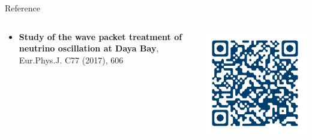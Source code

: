 \documentclass[usenames, dvipsnames]{beamer}
\newcommand{\Important}{\textcolor{BrickRed}}
\newcommand{\impitem}{\item[\Important{$\bullet$}]}
\begin{document}
\begin{frame}[fragile]
\begin{columns}[T]
\begin{column}{.47\textwidth}
\begin{block}{Reference}
    \begin{columns}[T]
        \begin{column}{0.8\textwidth}
            \begin{itemize}
                \impitem \textbf{Study of the wave packet treatment of neutrino
                oscillation at Daya Bay},
                \\ Eur.Phys.J. C77 (2017), 606
            \end{itemize}
        \end{column}
        \begin{column}{0.2\textwidth}
        \vspace*{-3cm}
        \hspace*{\fill}
        \href{https://link.springer.com/article/10.1140%2Fepjc%2Fs10052-017-4970-y}
        { \includegraphics[scale=0.8]{./pics/paper_qr_nologo.png}}
        \end{column}
    \end{columns}
\end{block}
                
\end{column}


\end{columns}
\end{frame}
\end{document}
